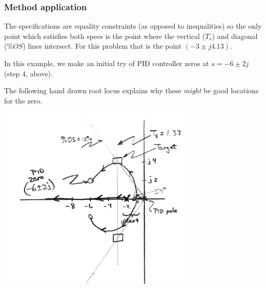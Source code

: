 \begin{ExampleCont}

\subsubsection*{Method application}
The specifications are equality constraints (as opposed to inequalities) so the only point which satisfies both specs is the point where the vertical ($T_s$) and diagonal ($\%OS$) lines intersect.  For this problem that is the point $(-3 \pm j4.13)$.

In this example, we make an initial try of PID controller zeros at $s=-6\pm2j$ (step 4, above).

The following hand drawn root locus explains why these {\it might} be good locations for the
 zero.

\includegraphics[width=95mm]{figs09/00823a.png}

\end{ExampleCont}
